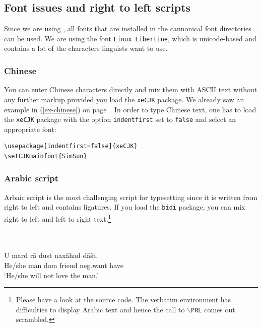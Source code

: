 \subsection{Font issues and right to left scripts}

Since we are using \xelatex, all fonts that are installed in the cannonical font directories can be
used. We are using the font \texttt{Linux Libertine}, which is unicode-based and contains a lot of
the characters linguists want to use.

\subsubsection{Chinese}
\label{sec-Chinese}

You can enter Chinese characters directly and mix them with ASCII text without any further markup
provided you load the \texttt{xeCJK} package. We already saw an example in (\ref{ex-chinese}) on
page~\pageref{ex-chinese}. In order to type Chinese text, one has to load the \texttt{xeCJK} package
with the option \verb+indentfirst+ set to \verb+false+ and select an appropriate font:
\begin{verbatim}
\usepackage[indentfirst=false]{xeCJK}
\setCJKmainfont{SimSun}
\end{verbatim}


\subsubsection{Arabic script}

Arbaic script is the most challenging script for typesetting since it is written from right to left
and contains ligatures. If you load the \texttt{bidi} package, you can mix right to left and left to
right text.\footnote{
  Please have a look at the source code. The verbatim environment has difficulties to display Arabic
  text and hence the call to \texttt{$\backslash$PRL} comes out scrambled.
}

\ea
{}\\

\\
 \gll U      mard rā        dust   naxāhad        dāšt.\\
      He/she man  {\sc dom} friend {\sc neg}.want have\\
\glt `He/she will not love the man.'
\z

